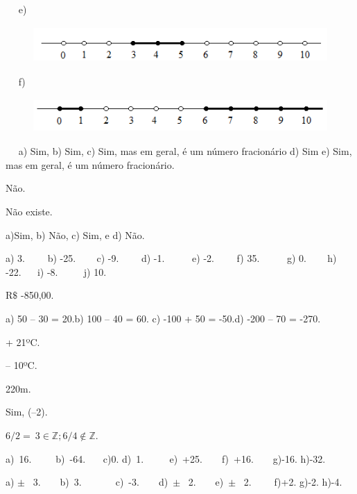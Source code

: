 \begin{respostas}{2}
\begin{figure}[H]
\end{figure}
~~
e)
\begin{figure}[H]
	\begin{Center}
		\includegraphics[width=4.94in,height=0.54in]{capitulos/conjuntos_numericos/media/image15.png}
	\end{Center}
\end{figure}
~~
f)
\begin{figure}[H]
	\begin{Center}
		\includegraphics[width=4.83in,height=0.5in]{capitulos/conjuntos_numericos/media/image16.png}
	\end{Center}
\end{figure}
~~
	\ansitem{} a) Sim, b) Sim, c) Sim, mas em geral, é um número fracionário d) Sim e) Sim, mas em geral, é um número fracionário.

    \ansitem{} Não.

	\ansitem{} Não existe.

	\ansitem{} a)Sim, b) Não, c) Sim, e d) Não.

\end{respostas}

\begin{respostas}{3}
	\ansitem{} a) 3.~~~~ b) -25.~~ ~ c) -9.~~~~ d) -1.~~~~~ e) -2.~~~~ f) 35.~~~~~ g) 0.~~ ~ h) -22.~ ~  i) -8. ~~~~ j) 10.

	\ansitem{} R$\$$  -850,00.

	\ansitem{} a) 50 – 30 = 20.\quad b) 100 – 40 = 60.  \quad c) -100 + 50 = -50.\quad d) -200 – 70 = -270.

	\ansitem{} + 21ºC.

	\ansitem{} – 10ºC.

	\ansitem{} 220m.

	\ansitem{} Sim, (–2).

	\ansitem{} \( 6/2=~3   \in \mathbb{Z};6/4 \notin  \mathbb{Z} \).  

\ansitem{} a)~16.~~~~~b)~-64.~~~ c)0.     d)~1.~~  ~~ e)~+25.~~~~f)~+16.~~~~g)-16.     h)-32.

\ansitem{}a) $ \pm $ ~3.~~~~b)~3.~~~~~~~c)~-3.~~~~d)~$ \pm $ ~2.~~~~e)~$ \pm $ ~2.~~~~ f)+2.      g)-2.       h)-4.
\end{respostas}

